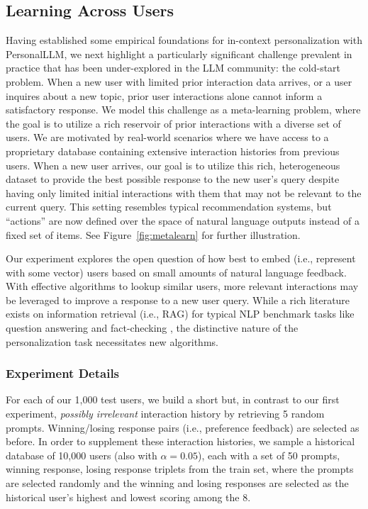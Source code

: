 \subsection{Learning Across Users}

Having established some empirical foundations for in-context personalization with \textsf{PersonalLLM}, we next highlight a particularly significant challenge prevalent in practice that has been under-explored in the LLM community: the cold-start problem. 
When a new user with limited prior interaction data arrives, or a user inquires about a new topic, prior user interactions alone cannot inform a satisfactory response.
We model this challenge as a meta-learning problem, where the goal is to utilize a rich reservoir of prior interactions with a diverse set of users. 
We are motivated by real-world scenarios where we have access to a proprietary database containing extensive interaction histories from previous users. 
When a new user arrives, our goal is to utilize this rich, heterogeneous dataset to provide the best possible response to the new user's query despite having only limited initial interactions with them that may not be relevant to the current query. 
This setting resembles typical recommendation systems, but ``actions'' are now defined over the space of natural language outputs instead of a fixed set of items.
See Figure~\ref{fig:metalearn} for further illustration.

Our experiment explores the open question of how best to embed (i.e., represent with some vector) users based on small amounts of natural language feedback.  
With effective algorithms to lookup similar users, more relevant interactions may be leveraged to improve a response to a new user query.
While a rich literature exists on information retrieval (i.e., RAG) for typical NLP benchmark tasks like question answering and fact-checking \citep{lewis2021retrievalaugmentedgenerationknowledgeintensivenlp, gao2024retrievalaugmentedgenerationlargelanguage}, the distinctive nature of the personalization task necessitates new algorithms.

\subsubsection{Experiment Details}

For each of our 1,000 test users, we build a short but, in contrast to our first experiment, \textit{possibly irrelevant} interaction history by retrieving 5 random prompts.  Winning/losing response pairs (i.e., preference feedback) are selected as before.  In order to supplement these interaction histories, we sample a historical database of 10,000 users (also with $\alpha=0.05$), each with a set of 50 prompts, winning response, losing response triplets from the train set, where the prompts are selected randomly and the winning and losing responses are selected as the historical user's highest and lowest scoring among the 8.

